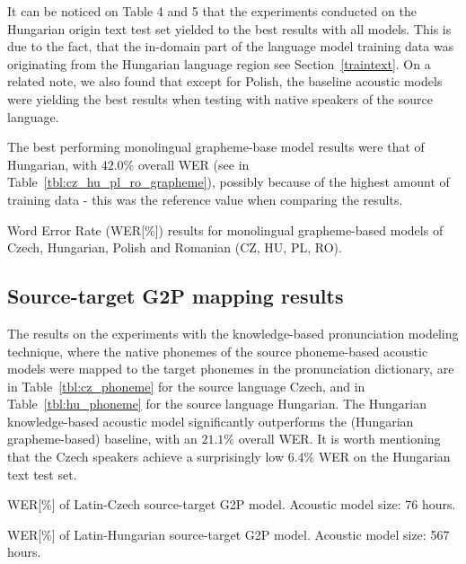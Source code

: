 \documentclass[runningheads,a4paper]{llncs}
\begin{document}
It can be noticed on Table 4 and 5 that the experiments conducted on the Hungarian origin text test set yielded to the best results with all models.
This is due to the fact, that the in-domain part of the language model training data was originating from the Hungarian language region see Section~\ref{traintext}.
On a related note, we also found that except for Polish, the baseline acoustic models were yielding the best results when testing with native speakers of the source language.

The best performing monolingual grapheme-base model results were that of Hungarian, with $42.0\%$ overall WER (see in Table~\ref{tbl:cz_hu_pl_ro_grapheme}), possibly because of the highest amount of training data - this was the reference value when comparing the results.
\begin{table}
\centering
\caption{Word Error Rate (WER[\%]) results for monolingual grapheme-based models of Czech, Hungarian, Polish and Romanian (CZ, HU, PL, RO).}
\label{tbl:cz_hu_pl_ro_grapheme}
\end{table}

\subsection{Source-target G2P mapping results}
The results on the experiments with the knowledge-based pronunciation modeling technique, where the native phonemes of the source phoneme-based acoustic models were mapped to the target phonemes in the pronunciation dictionary, are in Table~\ref{tbl:cz_phoneme} for the source language Czech, and in Table~\ref{tbl:hu_phoneme} for the source language Hungarian.
The Hungarian knowledge-based acoustic model significantly outperforms the (Hungarian grapheme-based) baseline, with an $21.1\%$ overall WER.
It is worth mentioning that the Czech speakers achieve a surprisingly low $6.4\%$ WER on the Hungarian text test set.

\begin{table}
\parbox{.45\linewidth}{
\centering
\caption{WER[\%] of Latin-Czech source-target G2P model. Acoustic model size: 76 hours.}
\label{tbl:cz_phoneme}
}
\hfill
\parbox{.45\linewidth}{
\centering
\caption{WER[\%] of Latin-Hungarian source-target G2P model. Acoustic model size: 567 hours.}
\label{tbl:hu_phoneme}
}
\end{table}
\end{document}
